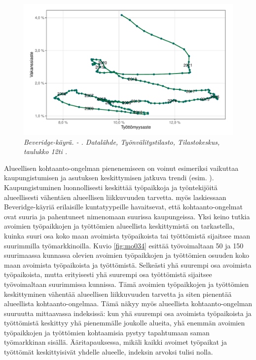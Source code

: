 \documentclass[12pt]{article}
\newcommand{\lastdatamonth}{\unskip}
\newcommand{\firstdatamonth}{\unskip}
\newcommand{\newcaption}[1]{\caption{\textit{\footnotesize{#1}}}}
\begin{document}
\begin{figure}
\centering
\includegraphics[scale = 0.8]{../kuviot/beveridge_curve.pdf}
    \newcaption{Beveridge-käyrä. \protect  \firstdatamonth \phantom{} - \protect\lastdatamonth. Datalähde, Työnvälitystilasto, Tilastokeskus, taulukko 12ti \protect \cite{svt2011}.}
   \label{fig:ld0923g}
\end{figure}

Alueellisen kohtaanto-ongelman pienenemiseen on voinut esimeriksi vaikuttaa kaupungistumisen ja asutuksen keskittymisen jatkuva trendi (esim. ). Kaupungistuminen luonnollisesti keskittää työpaikkoja ja työntekijöitä alueellisesti vähentäen alueellisen liikkuvuuden tarvetta.  myös laskiessaan Beveridge-käyriä erilaisille kuntatyypeille havaitsevat, että kohtaanto-ongelmat ovat suuria ja pahentuneet nimenomaan suurissa kaupungeissa. Yksi keino tutkia avoimien työpaikkojen ja työttömien alueellista keskittymistä on tarkastella, kuinka suuri osa koko maan avoimista työpaikoista tai työttömistä sijaitsee maan suurimmilla työmarkkinoilla. Kuvio \ref{fig:mo034} esittää työvoimaltaan 50 ja 150 suurimaassa kunnassa olevien avoimien työpaikkojen ja työttömien osuuden koko maan avoimista työpaikoista ja työttömistä. Selkeästi yhä suurempi osa avoimista työpaikoista, mutta erityisesti yhä suurempi osa työttömistä sijaitsee työvoimaltaan suurimmissa kunnissa. Tämä avoimien työpaikkojen ja työttömien keskittyminen vähentää alueellisen liikkuvuuden tarvetta ja siten pienentää alueellista kohtaanto-ongelmaa. Tämä näkyy myös alueellista kohtaanto-ongelman suuruutta mittaavassa indeksissä: kun yhä suurempi osa avoimista työpaikoista ja työttömistä keskittyy yhä pienemmälle joukolle alueita, yhä enemmän avoimien työpaikkojen ja työttömien kohtaamisia pystyy tapahtumaan saman työmarkkinan sisällä. Ääritapauksessa, mikäli kaikki avoimet työpaikat ja työttömät keskittyisivät yhdelle alueelle, indeksin arvoksi tulisi nolla.
\end{document}
